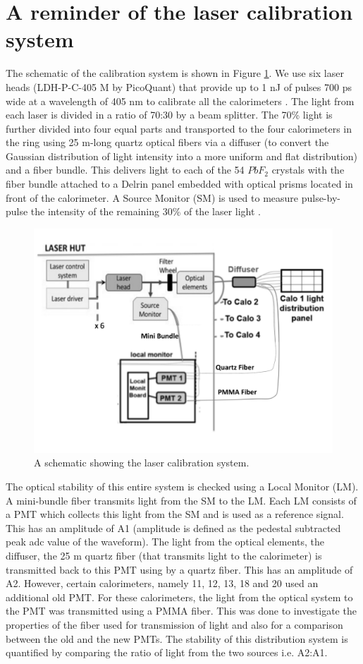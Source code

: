 \documentclass[article,accept,moreauthors,pdftex,10pt,a4paper]{Definitions/mdpi}
\begin{document}

\section{A reminder of the laser calibration system}
The schematic of the calibration system is shown in Figure \ref{fig1}. 
We use six laser heads (LDH-P-C-405 M by PicoQuant) that provide up to 
1 nJ of pulses 700 ps wide at a wavelength of 405 nm to calibrate all the 
calorimeters \cite{anas}. The light from each laser is divided in a ratio of 
70:30 by a beam splitter. The 70\% light is further divided into four equal
parts and transported to the four calorimeters in
the ring using 25 m-long quartz optical fibers via a diffuser (to convert the 
Gaussian distribution of light intensity into a more uniform and flat distribution) and a fiber bundle. 
This delivers light to each of the 54 $PbF_2$ crystals with the fiber bundle attached to a 
Delrin panel embedded with optical prisms located in front of the calorimeter. 
A Source Monitor (SM) is used to measure pulse-by-pulse
the intensity of the remaining 30\% of the laser light \cite{c2}. 
\begin{figure}[H]
\centering
\includegraphics[width=9 cm]{laser_sys.pdf}
\caption{\label{fig1}A schematic showing the laser calibration system. }
\end{figure} 
The optical stability of this entire system is checked 
using a Local Monitor (LM). A mini-bundle fiber transmits 
light from the SM to the LM. Each LM consists of a PMT 
which collects this light from the SM and is used as a reference signal. 
This has an amplitude of A1 (amplitude is defined as the pedestal subtracted 
peak adc value of the waveform). The light from the optical elements, 
the diffuser, the 25 m quartz fiber (that transmits light to the calorimeter) is
transmitted back to this PMT using by a quartz fiber. This has an amplitude of A2.
However, certain calorimeters, namely 11, 12, 13, 18 and 20 used an additional 
old PMT. For these calorimeters, the light from the optical system to the PMT was 
transmitted using a PMMA fiber. This was done to investigate the properties of the 
fiber used for transmission of light and also 
for a comparison between the old and the new PMTs.
The stability of this distribution system is quantified by comparing the ratio of light
from the two sources i.e. A2:A1. 
\end{document}
